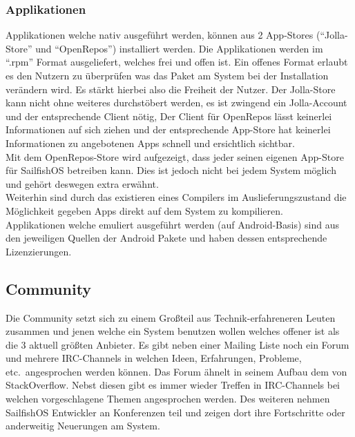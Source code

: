 \subsubsection{Applikationen}
Applikationen welche nativ ausgeführt werden, können aus 2 App-Stores (``Jolla-Store'' und ``OpenRepos''\cite{online:openrepos}) installiert werden. Die Applikationen werden im ``\mbox{.rpm}'' Format ausgeliefert, welches frei und offen\cite{online:rpm-license} ist. Ein offenes Format erlaubt es den Nutzern zu überprüfen was das Paket am System bei der Installation verändern wird. Es stärkt hierbei also die Freiheit der Nutzer. Der Jolla-Store kann nicht ohne weiteres durchstöbert werden, es ist zwingend ein Jolla-Account und der entsprechende Client nötig\cite{online:jolla-store}, Der Client für OpenRepos lässt keinerlei Informationen auf sich ziehen und der entsprechende App-Store hat keinerlei Informationen zu angebotenen Apps schnell und ersichtlich sichtbar.\\
Mit dem OpenRepos-Store wird aufgezeigt, dass jeder seinen eigenen App-Store für \mbox{SailfishOS} betreiben kann. Dies ist jedoch nicht bei jedem System möglich und gehört deswegen extra erwähnt.\\
Weiterhin sind durch das existieren eines Compilers im Auslieferungszustand die Möglichkeit gegeben Apps direkt auf dem System zu kompilieren\cite{online:sailfish-list-licenses}.\\
Applikationen welche emuliert ausgeführt werden (auf Android-Basis) sind aus den jeweiligen Quellen der Android Pakete und haben dessen entsprechende Lizenzierungen.\\

\subsection{Community}
Die Community setzt sich zu einem Großteil aus Technik-erfahreneren Leuten zusammen und jenen welche ein System benutzen wollen welches offener ist als die 3 aktuell größten Anbieter. Es gibt neben einer Mailing Liste noch ein Forum und mehrere IRC-Channels\cite{online:sailfish-communitygeneral} in welchen Ideen, Erfahrungen, Probleme, etc.\ angesprochen werden können. Das Forum ähnelt in seinem Aufbau dem von StackOverflow. Nebst diesen gibt es immer wieder Treffen in IRC-Channels bei welchen vorgeschlagene Themen angesprochen werden. Des weiteren nehmen SailfishOS Entwickler an Konferenzen teil und zeigen dort ihre Fortschritte oder anderweitig Neuerungen am System\cite{online:sailfish-communitygeneral}.\\
\iffalse
